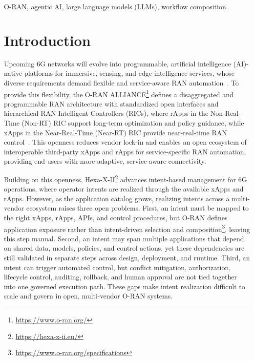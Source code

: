 \documentclass[conference]{IEEEtran}
\begin{document}
\begin{IEEEkeywords}
O-RAN, agentic AI, large language models (LLMs), workflow composition.
\end{IEEEkeywords}

\IEEEpeerreviewmaketitle

\section{Introduction}\label{sec:sec1} 
Upcoming 6G networks will evolve into programmable, artificial intelligence (AI)-native platforms for immersive, sensing, and edge-intelligence services, whose diverse requirements demand flexible and service-aware RAN automation~\cite{polese2026beyond}. To provide this flexibility, the O-RAN ALLIANCE\footnote{\url{https://www.o-ran.org/}} defines a disaggregated and programmable RAN architecture with standardized open interfaces and hierarchical RAN Intelligent Controllers (RICs), where rApps in the Non-Real-Time (Non-RT) RIC support long-term optimization and policy guidance, while xApps in the Near-Real-Time (Near-RT) RIC provide near-real-time RAN control~\cite{almeida2023ric}.
This openness reduces vendor lock-in and enables an open ecosystem of interoperable third-party xApps and rApps for service-specific RAN automation, providing end users with more adaptive, service-aware connectivity.


Building on this openness, Hexa-X-II\footnote{\url{https://hexa-x-ii.eu/}} advances intent-based management for 6G operations, where operator intents are realized through the available xApps and rApps. However, as the application catalog grows, realizing intents across a multi-vendor ecosystem raises three open problems. First, an intent must be mapped to the right xApps, rApps, APIs, and control procedures, but O-RAN defines application exposure rather than intent-driven selection and composition\footnote{\url{https://www.o-ran.org/specifications}}, leaving this step manual. Second, an intent may span multiple applications that depend on shared data, models, policies, and control actions, yet these dependencies are still validated in separate steps across design, deployment, and runtime. Third, an intent can trigger automated control, but conflict mitigation, authorization, lifecycle control, auditing, rollback, and human approval are not tied together into one governed execution path. These gaps make intent realization difficult to scale and govern in open, multi-vendor O-RAN systems.
\end{document}
